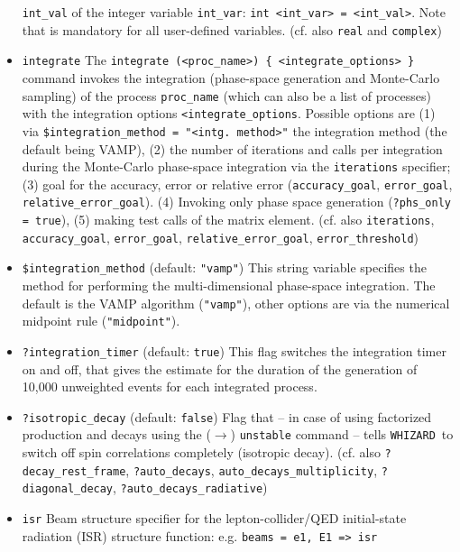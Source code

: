 \documentclass[12pt]{book}
\newcommand{\ttt}[1]{\texttt{#1}}
\newcommand{\whizard}{\texttt{WHIZARD}}
\begin{document}
\begin{itemize}
\ttt{int\_val} of the integer variable \ttt{int\_var}: 
\ttt{int <int\_var> = <int\_val>}. Note that is mandatory for all
user-defined variables. (cf. also \ttt{real} and \ttt{complex})
\item
\ttt{integrate} \newline
The \ttt{integrate (<proc\_name>) \{ <integrate\_options> \}} command
invokes the integration (phase-space generation and Monte-Carlo
sampling) of the process \ttt{proc\_name} (which can also be a list of
processes) with the integration options
\ttt{<integrate\_options}. Possible options are (1) via
\ttt{\$integration\_method = "<intg. method>"} the integration
method (the default being VAMP), (2) the number of iterations and
calls per integration during the Monte-Carlo phase-space integration
via the \ttt{iterations} specifier; (3) goal for the
accuracy, error or relative error (\ttt{accuracy\_goal},
\ttt{error\_goal}, \ttt{relative\_error\_goal}). (4) Invoking only
phase space generation (\ttt{?phs\_only = true}), (5) making test
calls of the matrix element. (cf. also \ttt{iterations},
\ttt{accuracy\_goal}, \ttt{error\_goal}, \ttt{relative\_error\_goal},
\ttt{error\_threshold}) 
\item
\ttt{\$integration\_method} \qquad (default: \ttt{"vamp"}) \newline
This string variable specifies the method for performing the
multi-dimensional phase-space integration. The default is the VAMP
algorithm (\ttt{"vamp"}), other options are via the numerical
midpoint rule (\ttt{"midpoint"}).
\item
\ttt{?integration\_timer} \qquad (default: \ttt{true}) \newline
This flag switches the integration timer on and off, that gives the
estimate for the duration of the generation of 10,000 unweighted
events for each integrated process. 
\item
\ttt{?isotropic\_decay} \qquad (default: \ttt{false}) \newline
Flag that -- in case of using factorized production and decays using
the ($\to$) \ttt{unstable} command -- tells \whizard\ to switch off
spin correlations completely (isotropic decay). (cf. also 
\ttt{?decay\_rest\_frame}, \ttt{?auto\_decays},
\ttt{auto\_decays\_multiplicity}, \ttt{?diagonal\_decay},
\ttt{?auto\_decays\_radiative}) 
\item
\ttt{isr} \newline
Beam structure specifier for the lepton-collider/QED initial-state
radiation (ISR) structure function: e.g. \ttt{beams = e1, E1 => isr}

\end{itemize}
\end{document}
